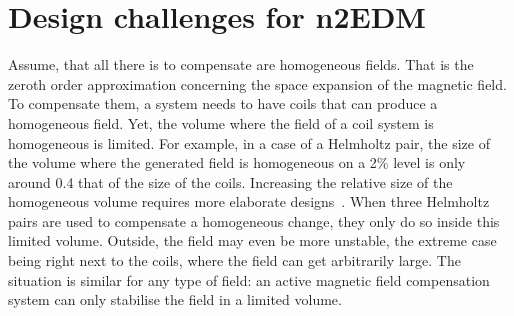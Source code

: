 



\section{Design challenges for n2EDM}
\label{sec:n2EDM_challenges}
Assume, that all there is to compensate are homogeneous fields. That is the zeroth order approximation concerning the space expansion of the magnetic field. To compensate them, a system needs to have coils that can produce a homogeneous field. Yet, the volume where the field of a coil system is homogeneous is limited. For example, in a case of a Helmholtz pair, the size of the volume where the generated field is homogeneous on a 2\% level is only around 0.4 that of the size of the coils. Increasing the relative size of the homogeneous volume requires more elaborate designs~\cite{Kirschvink1992}. When three Helmholtz pairs are used to compensate a homogeneous change, they only do so inside this limited volume. Outside, the field may even be more unstable, the extreme case being right next to the coils, where the field can get arbitrarily large. The situation is similar for any type of field: an active magnetic field compensation system can only stabilise the field in a limited volume.





